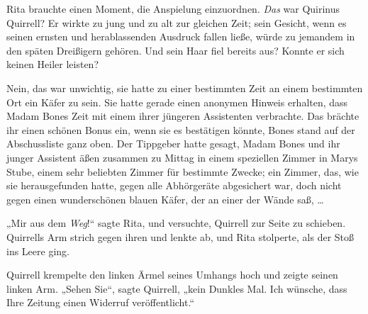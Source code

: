 Rita brauchte einen Moment, die Anspielung einzuordnen. \emph{Das} war Quirinus Quirrell? Er wirkte zu jung und zu alt zur gleichen Zeit; sein Gesicht, wenn es seinen ernsten und herablassenden Ausdruck fallen ließe, würde zu jemandem in den späten Dreißigern gehören. Und sein Haar fiel bereits aus? Konnte er sich keinen Heiler leisten?

Nein, das war unwichtig, sie hatte zu einer bestimmten Zeit an einem bestimmten Ort ein Käfer zu sein. Sie hatte gerade einen anonymen Hinweis erhalten, dass Madam Bones Zeit mit einem ihrer jüngeren Assistenten verbrachte. Das brächte ihr einen schönen Bonus ein, wenn sie es bestätigen könnte, Bones stand auf der Abschussliste ganz oben. Der Tippgeber hatte gesagt, Madam Bones und ihr junger Assistent äßen zusammen zu Mittag in einem speziellen Zimmer in Marys Stube, einem sehr beliebten Zimmer für bestimmte Zwecke; ein Zimmer, das, wie sie herausgefunden hatte, gegen alle Abhörgeräte abgesichert war, doch nicht gegen einen wunderschönen blauen Käfer, der an einer der Wände saß, …

„Mir aus dem \emph{Weg}!“ sagte Rita, und versuchte, Quirrell zur Seite zu schieben. Quirrells Arm strich gegen ihren und lenkte ab, und Rita stolperte, als der Stoß ins Leere ging.

Quirrell krempelte den linken Ärmel seines Umhangs hoch und zeigte seinen linken Arm.
„Sehen Sie“, sagte Quirrell, „kein Dunkles Mal. Ich wünsche, dass Ihre Zeitung einen Widerruf veröffentlicht.“

